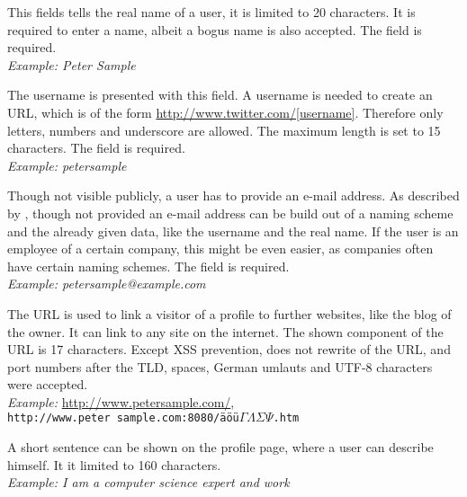 \begin{description}
\item[Name] This fields tells the real name of a user, it is limited to 20
            characters. It is required to enter a name, albeit a bogus name is
            also accepted. The field is required.\\
            \textit{Example: Peter Sample}
\item[Username] The username is presented with this field. A username is needed
                to create an URL, which is of the form \url{http://www.twitter.com/[username]}.
                Therefore only letters, numbers and underscore are allowed. The maximum length
                is set to 15 characters. The field is required.\\
                \textit{Example: petersample}
\item[E-mail] Though not visible publicly, a \Twitter{} user has to provide an
              e-mail address. As described by \cite{brown2008}, though not provided an e-mail
              address can be build out of a naming scheme and the already
              given data, like the username and the real name. If the user
              is an employee of a certain company, this might be even easier,
              as companies often have certain naming schemes. The field is required.\\
              \textit{Example: petersample@example.com}
\item[More Info URL] The URL is used to link a visitor of a profile to further
                     websites, like the blog of the owner. It can link to
                     any site on the internet. The shown component of the
                     URL is 17 characters. Except XSS prevention,
                     \Twitter{} does not rewrite of the URL, and port numbers
                     after the TLD, spaces, German umlauts and UTF-8 characters were
                     accepted.\\
                     \textit{Example:} \url{http://www.petersample.com/},\\
                     \texttt{http://www.peter sample.com:8080/äöü$\Gamma\Lambda\Sigma\Psi$.htm}
\item[One Line Bio] A short sentence can be shown on the profile page, where a
                    user can describe himself. It it limited to 160
                    characters.\\
                    \textit{Example: I am a computer science expert and work
}
\end{description}
